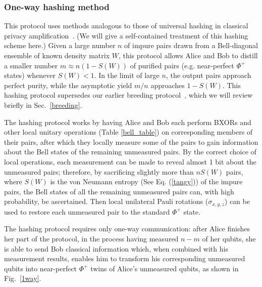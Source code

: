 \subsubsection{One-way hashing method}
\label{hashing}
 
This protocol uses methods analogous to those of universal hashing in
classical privacy amplification~\cite{privacyamplification}.  (We will
give a self-contained treatment of this hashing scheme here.)  Given a
large number $n$ of impure pairs drawn from a Bell-diagonal ensemble
of known density matrix $W$, this protocol allows Alice and Bob to
distill a smaller number $m\approx n(1\!-\!S(W))$ of purified pairs
(e.g. near-perfect $\Phi^+$ states) whenever $S(W)<1$. In the limit of
large $n$, the output pairs approach perfect purity, while the
asymptotic yield $m/n$ approaches $1\!-\!S(W)$.  This hashing protocol
supersedes our earlier breeding protocol~\cite{purification}, which we
will review briefly in Sec.~\ref{breeding}.
 
The hashing protocol works by having Alice and Bob each perform BXORs and
other local unitary operations (Table \ref{bell_table}) on
corresponding members of their pairs, after which they locally measure
some of the pairs to gain information about the Bell states of the
remaining unmeasured pairs.  By the correct choice of local
operations, each measurement can be made to reveal almost 1 bit about
the unmeasured pairs; therefore, by sacrificing slightly more than
$nS(W)$ pairs, where $S(W)$ is the von Neumann entropy (See
Eq. (\ref{tangy})) of the impure pairs, the Bell states of all the
remaining unmeasured pairs can, with high probability, be ascertained.
Then local unilateral Pauli rotations ($\sigma_{x,y,z}$) can be used
to restore each unmeasured pair to the standard $\Phi^+$ state.
 
The hashing protocol requires only one-way communication: after Alice
finishes her part of the protocol, in the process having measured
$n\!-\!m$ of her qubits, she is able to send Bob classical information
which, when combined with his measurement results, enables him to
transform his corresponding unmeasured qubits into near-perfect
$\Phi^+$ twins of Alice's unmeasured qubits, as shown in
Fig.~\ref{1way}.
 

